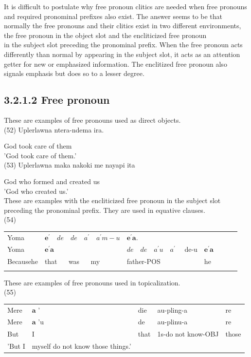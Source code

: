 \documentclass[10pt]{article}
\begin{document}
It is difficult to postulate why free pronoun clitics are needed when free pronouns and required pronominal prefixes also exist. The answer seems to be that normally the free pronouns and their clitics exist in two different environments, the free pronoun in the object slot and the encliticized free pronoun\\
in the subject slot preceding the pronominal prefix. When the free pronoun acts differently than normal by appearing in the subject slot, it acts as an attention getter for new or emphasized information. The enclitized free pronoun also signals emphasis but does so to a lesser degree.

\subsection*{3.2.1.2 Free pronoun}
These are examples of free pronouns used as direct objects.\\
(52) Uplerlawna ntera-ndema ira.

God took care of them\\
'God took care of them.'\\
(53) Uplerlawna maka nakoki me nayapi ita

God who formed and created us\\
'God who created us.'\\
These are examples with the encliticized free pronoun in the subject slot preceding the pronominal prefix. They are used in equative clauses.\\
(54)

\begin{center}
\begin{tabular}{lllllll}
Yoma & \(\boldsymbol{e}^{\prime} \quad d e \quad d e \quad a^{\prime} \quad a^{\prime} m-u\) & \(\boldsymbol{e}^{\prime} \boldsymbol{a}\). &  \\
Yoma & \(\boldsymbol{e}^{\prime} \boldsymbol{a}\) & \(d e \quad d e \quad a^{\prime} u \quad a^{\prime} \quad\) de-u & \(\boldsymbol{e}^{\prime} \boldsymbol{a}\) \\
Becausehe & that \(\quad\) was \(\quad\) my & father-POS & he \\
 &  &  &  \\
\end{tabular}
\end{center}

These are examples of free pronouns used in topicalization.\\
(55)

\begin{center}
\begin{tabular}{lllll}
Mere & \(\boldsymbol{a}\) ' & die & au-pling-a & re \\
Mere & \(\boldsymbol{a}\) 'u & de & au-plinu-a & re \\
But & I & that & 1s-do not know-OBJ & those \\
'But I & myself do not know those things.' &  &  &  \\
\end{tabular}
\end{center}
\end{document}
